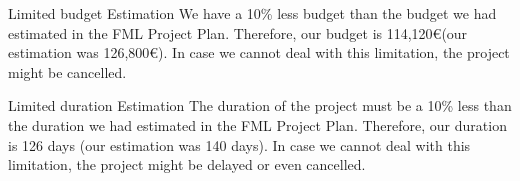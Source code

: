 \begin{risk}{Limited budget}
\riskcat Estimation
\riskdesc We have a 10\% less budget than the budget we had estimated in the FML Project Plan. Therefore, our budget is 114,120\euro (our estimation was 126,800\euro). In case we cannot deal with this limitation, the project might be cancelled.
\end{risk}

\begin{risk}{Limited duration}
\riskcat Estimation
\riskdesc The duration of the project must be a 10\% less than the duration we had estimated in the FML Project Plan. Therefore, our duration is 126 days (our estimation was 140 days). In case we cannot deal with this limitation, the project might be delayed or even cancelled.
\end{risk}
